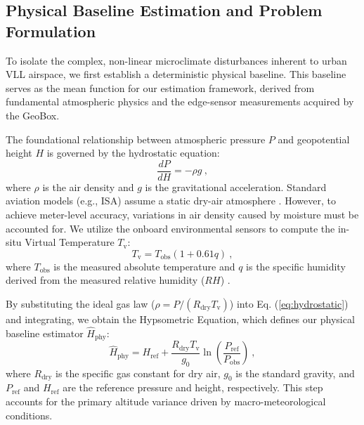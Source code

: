 \subsection{Physical Baseline Estimation and Problem Formulation}
\label{subsec:physical_baseline}

To isolate the complex, non-linear microclimate disturbances inherent to urban VLL airspace, we first establish a deterministic physical baseline. This baseline serves as the mean function for our estimation framework, derived from fundamental atmospheric physics and the edge-sensor measurements acquired by the GeoBox.

The foundational relationship between atmospheric pressure $P$ and geopotential height $H$ is governed by the hydrostatic equation:
\begin{equation}
\frac{dP}{dH} = -\rho g \ ,
\label{eq:hydrostatic}
\end{equation}
where $\rho$ is the air density and $g$ is the gravitational acceleration. Standard aviation models (e.g., ISA) assume a static dry-air atmosphere \cite{icao1993manual}. However, to achieve meter-level accuracy, variations in air density caused by moisture must be accounted for. We utilize the onboard environmental sensors to compute the in-situ Virtual Temperature $T_\text{v}$:
\begin{equation}
T_\text{v} = T_\text{obs} (1 + 0.61 q) \ ,
\label{eq:virtual_temp}
\end{equation}
where $T_\text{obs}$ is the measured absolute temperature and $q$ is the specific humidity derived from the measured relative humidity ($RH$) \cite{simonetti2024geodetic}.

By substituting the ideal gas law ($\rho = P / (R_\text{dry} T_\text{v})$) into Eq. (\ref{eq:hydrostatic}) and integrating, we obtain the Hypsometric Equation, which defines our physical baseline estimator $\hat{H}_\text{phy}$:
\begin{equation}
\hat{H}_\text{phy} = H_\text{ref} + \frac{R_\text{dry} T_\text{v}}{g_0} \ln\left(\frac{P_\text{ref}}{P_\text{obs}}\right) \ ,
\label{eq:hypsometric}
\end{equation}
where $R_\text{dry}$ is the specific gas constant for dry air, $g_0$ is the standard gravity, and $P_\text{ref}$ and $H_\text{ref}$ are the reference pressure and height, respectively. This step accounts for the primary altitude variance driven by macro-meteorological conditions.

